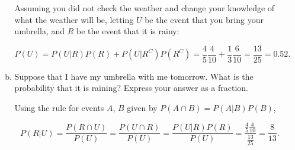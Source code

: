 \documentclass[letterpaper,12pt,fleqn]{article}
\begin{document}
\begin{enumerate}
\begin{enumerate}[(a)]
Assuming you did not check the weather and change your knowledge of what the weather will be, letting $U$ be the event that you bring your umbrella, and $R$ be the event that it is rainy:

$$P(U) = P(U|R)P(R) + P(U|R^C)P(R^C) = \frac{4}{5}\frac{4}{10} + \frac{1}{3}\frac{6}{10} = \frac{13}{25} = 0.52.$$

\item Suppose that I have my umbrella with me tomorrow.  What is the probability that it is raining? Express your answer as a fraction.

Using the rule for events $A$, $B$ given by $P(A \cap B) = P(A|B)P(B)$,

$$P(R|U) = \frac{P(R \cap U)}{P(U)}= \frac{P(U \cap R)}{P(U)} = \frac{P(U|R)P(R)}{P(U)}= \frac{\frac{4}{5}\frac{4}{10}}{\frac{13}{25}} = \frac{8}{13}.$$
\end{enumerate}





\end{enumerate}
\end{document}
